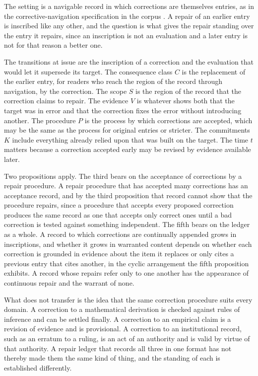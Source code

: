 The setting is a navigable record in which corrections are themselves entries, as in the corrective-navigation specification in the corpus \cite{corrective}. A repair of an earlier entry is inscribed like any other, and the question is what gives the repair standing over the entry it repairs, since an inscription is not an evaluation and a later entry is not for that reason a better one.

The transitions at issue are the inscription of a correction and the evaluation that would let it supersede its target. The consequence class $C$ is the replacement of the earlier entry, for readers who reach the region of the record through navigation, by the correction. The scope $S$ is the region of the record that the correction claims to repair. The evidence $V$ is whatever shows both that the target was in error and that the correction fixes the error without introducing another. The procedure $P$ is the process by which corrections are accepted, which may be the same as the process for original entries or stricter. The commitments $K$ include everything already relied upon that was built on the target. The time $t$ matters because a correction accepted early may be revised by evidence available later.

Two propositions apply. The third bears on the acceptance of corrections by a repair procedure. A repair procedure that has accepted many corrections has an acceptance record, and by the third proposition that record cannot show that the procedure repairs, since a procedure that accepts every proposed correction produces the same record as one that accepts only correct ones until a bad correction is tested against something independent. The fifth bears on the ledger as a whole. A record to which corrections are continually appended grows in inscriptions, and whether it grows in warranted content depends on whether each correction is grounded in evidence about the item it replaces or only cites a previous entry that cites another, in the cyclic arrangement the fifth proposition exhibits. A record whose repairs refer only to one another has the appearance of continuous repair and the warrant of none.

What does not transfer is the idea that the same correction procedure suits every domain. A correction to a mathematical derivation is checked against rules of inference and can be settled finally. A correction to an empirical claim is a revision of evidence and is provisional. A correction to an institutional record, such as an erratum to a ruling, is an act of an authority and is valid by virtue of that authority. A repair ledger that records all three in one format has not thereby made them the same kind of thing, and the standing of each is established differently.

